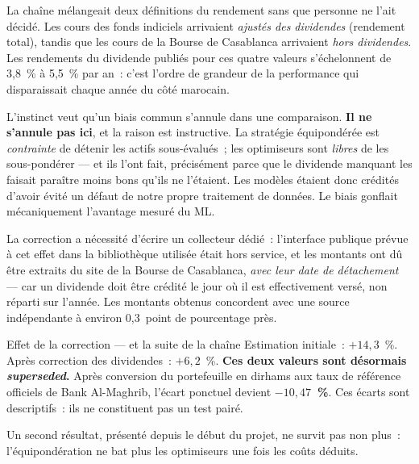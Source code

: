 La chaîne mélangeait deux définitions du rendement sans que personne ne l'ait
décidé. Les cours des fonds indiciels arrivaient \emph{ajustés des dividendes}
(rendement total), tandis que les cours de la Bourse de Casablanca arrivaient
\emph{hors dividendes}. Les rendements du dividende publiés pour ces quatre
valeurs s'échelonnent de 3,8~\% à 5,5~\% par an~: c'est l'ordre de grandeur de la
performance qui disparaissait chaque année du côté marocain.

L'instinct veut qu'un biais commun s'annule dans une comparaison. \textbf{Il ne
s'annule pas ici}, et la raison est instructive. La stratégie équipondérée est
\emph{contrainte} de détenir les actifs sous-évalués~; les optimiseurs sont
\emph{libres} de les sous-pondérer — et ils l'ont fait, précisément parce que le
dividende manquant les faisait paraître moins bons qu'ils ne l'étaient. Les
modèles étaient donc crédités d'avoir évité un défaut de notre propre traitement
de données. Le biais gonflait mécaniquement l'avantage mesuré du ML.

La correction a nécessité d'écrire un collecteur dédié~: l'interface publique
prévue à cet effet dans la bibliothèque utilisée était hors service, et les
montants ont dû être extraits du site de la Bourse de Casablanca, \emph{avec leur
date de détachement} — car un dividende doit être crédité le jour où il est
effectivement versé, non réparti sur l'année. Les montants obtenus concordent
avec une source indépendante à environ 0,3~point de pourcentage près.

\begin{resultatbox}{Effet de la correction — et la suite de la chaîne}
Estimation initiale~: $+14{,}3$~\%. Après correction des dividendes~:
$+6{,}2$~\%. \textbf{Ces deux valeurs sont désormais \emph{superseded}.} Après
conversion du portefeuille en dirhams aux taux de référence officiels de Bank
Al-Maghrib, l'écart ponctuel devient \textbf{$-10{,}47$~\%}. Ces écarts sont
descriptifs~: ils ne constituent pas un test pairé.

Un second résultat, présenté depuis le début du projet, ne survit pas non plus~:
l'équipondération ne bat plus les optimiseurs une fois les coûts déduits.
\end{resultatbox}

